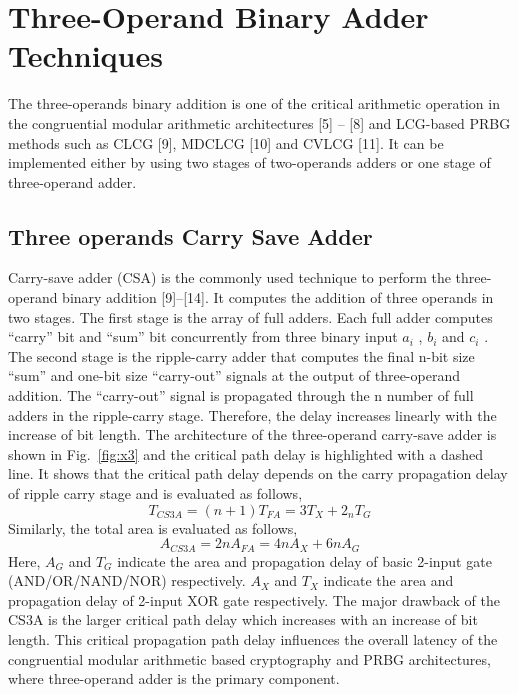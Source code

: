 \chapter{Three-Operand Binary Adder Techniques}

The three-operands binary addition is one of the critical arithmetic operation in the congruential modular arithmetic architectures [5] – [8] and LCG-based PRBG methods such as CLCG [9], MDCLCG [10] and CVLCG [11]. It can be implemented either by using two stages of two-operands adders or one stage of three-operand adder.

\section{Three operands Carry Save Adder}
Carry-save adder (CSA) is the commonly used technique to perform the three-operand binary addition [9]–[14]. It computes the addition of three operands in two stages. The first stage is the array of full adders. Each full adder computes “carry” bit and “sum” bit concurrently from three binary input $ a_{i} $ , $ b_{i} $ and $ c_{i} $ . The second stage is the ripple-carry adder that computes the final n-bit size “sum” and one-bit size “carry-out” signals at the output of three-operand addition. The “carry-out” signal is propagated through the n number of full adders in the ripple-carry stage. Therefore, the delay increases linearly with the increase of bit length. The architecture of the three-operand carry-save adder is shown in Fig.~\ref{fig:x3} and the critical path delay is highlighted with a dashed line. It shows that the critical path delay depends on the carry propagation delay of ripple carry stage and is evaluated as follows,
\begin{equation}
 T_{CS3A} = (n+1)T_{FA} = 3T_{X} + 2_{n}T_{G}
 \label{eq1} 
\end{equation}
Similarly, the total area is evaluated as follows,
\begin{equation}
A_{CS3A} = 2nA_{FA} = 4nA_{X} + 6nA_{G}
	\label{eq2}
\end{equation}
Here, $ A_{G} $ and $ T_{G} $ indicate the area and propagation delay of basic 2-input gate (AND/OR/NAND/NOR) respectively. $ A_{X} $ and $ T_{X} $ indicate the area and propagation delay of 2-input XOR gate respectively. The major drawback of the CS3A is the larger critical path delay which increases with an increase of bit length. This critical propagation path delay influences the overall latency of the congruential modular arithmetic based cryptography and PRBG architectures, where three-operand adder is the primary component.
